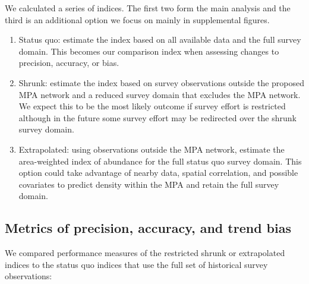 \documentclass[12pt]{article}
\begin{document}

We calculated a series of indices. The first two form the main analysis and the third is an additional option we focus on mainly in supplemental figures.

\begin{enumerate}

\item Status quo: estimate the index based on all available data and the full survey domain. This becomes our comparison index when assessing changes to precision, accuracy, or bias.

\item Shrunk: estimate the index based on survey observations outside the proposed MPA network and a reduced survey domain that excludes the MPA network. We expect this to be the most likely outcome if survey effort is restricted although in the future some survey effort may be redirected over the shrunk survey domain.

\item Extrapolated: using observations outside the MPA network,  estimate the area-weighted index of abundance for the full status quo survey domain. This option could take advantage of nearby data, spatial correlation, and possible covariates to predict density within the MPA and retain the full survey domain.
\end{enumerate}

\subsection*{Metrics of precision, accuracy, and trend bias}

We compared performance measures of the restricted shrunk or extrapolated indices to the status quo indices that use the full set of historical survey observations:
\end{document}
